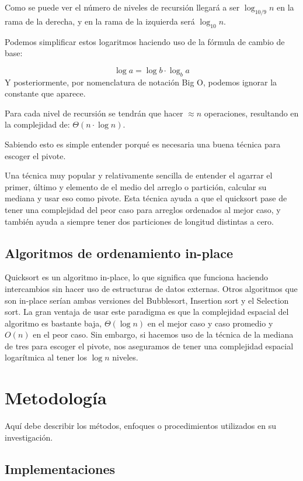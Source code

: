 \documentclass[conference]{IEEEtran}
\begin{document}
Como se puede ver el número de niveles de recursión llegará a ser $\log_{10/9}{n}$ en la rama de la derecha, y en la rama de la izquierda será $\log_{10}{n}$.\par
Podemos simplificar estos logaritmos haciendo uso de la fórmula de cambio de base:

\begin{equation}
    \log{a} = \log{b}\cdot \log_b{a}
\end{equation}
Y posteriormente, por nomenclatura de notación Big O, podemos ignorar la constante que aparece.\par

Para cada nivel de recursión se tendrán que hacer $\approx n$ operaciones, resultando en la complejidad de: $\Theta(n\cdot \log{n})$.

Sabiendo esto es simple entender porqué es necesaria una buena técnica para escoger el pivote.
\par Una técnica muy popular y relativamente sencilla de entender el agarrar el primer, último y elemento de el medio del arreglo o partición, 
calcular su mediana y usar eso como pivote.
Esta técnica ayuda a que el quicksort pase de tener una complejidad del peor caso para arreglos ordenados al mejor caso, y también ayuda a siempre tener dos particiones de longitud distintas a cero.

\subsection{Algoritmos de ordenamiento in-place}
Quicksort es un algoritmo in-place\cite{space_complexity}, lo que significa que funciona haciendo intercambios sin hacer uso de estructuras de datos externas. Otros algoritmos que son in-place serían ambas versiones del Bubblesort, Insertion sort y el Selection sort.
La gran ventaja de usar este paradigma es que la complejidad espacial del algoritmo es bastante baja, $\Theta(\log{n})$ en el mejor caso y caso promedio y $O(n)$ en el peor caso.
Sin embargo, si hacemos uso de la técnica de la mediana de tres para escoger el pivote, nos aseguramos de tener una complejidad espacial logarítmica al tener los $\log{n}$ niveles.

\section{Metodología}
Aquí debe describir los métodos, enfoques o procedimientos utilizados en su investigación.
\subsection{Implementaciones}
\end{document}
